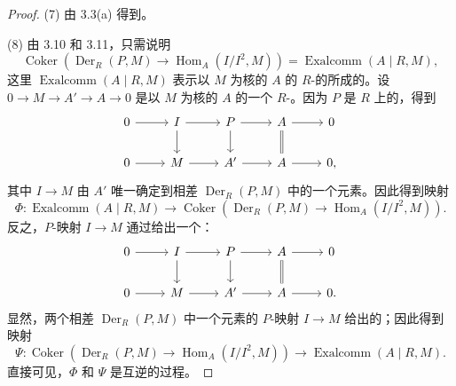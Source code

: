 \begin{proof}
(7) 由 3.3(a) 得到。

(8) 由 3.10 和 3.11，只需说明
\[\operatorname{Coker}(\operatorname{Der}_R(P,M)\to\operatorname{Hom}_A(I/I^2,M))=\operatorname{Exalcomm}(A\mid R,M),\]
这里 $\operatorname{Exalcomm}(A\mid R,M)$ 表示以 $M$ 为核的 $A$ 的 $R$-的所成的。设 $0\to M\to A'\to A\to0$ 是以 $M$ 为核的 $A$ 的一个 $R$-。因为 $P$ 是 $R$ 上的，得到
\[
\begin{tikzcd}
0\arrow[r]&I\arrow[r]\arrow[d]&P\arrow[r]\arrow[d]&A\arrow[r]\arrow[d,equal]&0\\
0\arrow[r]&M\arrow[r]&A'\arrow[r]&A\arrow[r]&0,
\end{tikzcd}
\]
其中 $I\to M$ 由 $A'$ 唯一确定到相差 $\operatorname{Der}_R(P,M)$ 中的一个元素。因此得到映射
\[\Phi:\operatorname{Exalcomm}(A\mid R,M)\longrightarrow\operatorname{Coker}(\operatorname{Der}_R(P,M)\to\operatorname{Hom}_A(I/I^2,M)).\]
反之，$P$-映射 $I\to M$ 通过给出一个：
\[
\begin{tikzcd}
0\arrow[r]&I\arrow[r]\arrow[d]&P\arrow[r]\arrow[d]&A\arrow[r]\arrow[d,equal]&0\\
0\arrow[r]&M\arrow[r]&A'\arrow[r]&A\arrow[r]&0.
\end{tikzcd}
\]
显然，两个相差 $\operatorname{Der}_R(P,M)$ 中一个元素的 $P$-映射 $I\to M$ 给出的；因此得到映射
\[\Psi:\operatorname{Coker}(\operatorname{Der}_R(P,M)\to\operatorname{Hom}_A(I/I^2,M))\longrightarrow\operatorname{Exalcomm}(A\mid R,M).\]
直接可见，$\Phi$ 和 $\Psi$ 是互逆的过程。
\end{proof}

